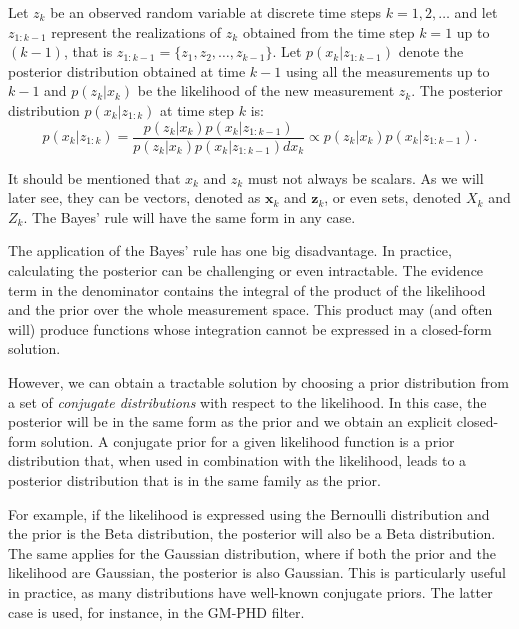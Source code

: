 \begin{theorem}
    Let $z_k$ be an observed random variable at discrete time steps
    $k = 1, 2, \ldots$ and let $z_{1:k-1}$ represent the realizations of $z_k$ 
    obtained from the time step $k = 1$ up to $(k-1)$, that is $z_{1:k-1} = 
    \{z_1, z_2,\ldots, z_{k-1}\}$. Let $p(x_k | z_{1:k-1})$ denote the posterior 
    distribution obtained at time $k-1$ using all the measurements up to $k-1$ 
    and $p(z_k | x_k)$ be the likelihood of the new measurement $z_k$. The 
    posterior distribution $p(x_k | z_{1:k})$ at time step $k$ is:
    $$
    p(x_k | z_{1:k}) 
        = \frac
            { p(z_k | x_k) p(x_k | z_{1:k-1}) }
            { p(z_k | x_k) p(x_k | z_{1:k-1}) dx_k }
        \propto p(z_k | x_k) p(x_k | z_{1:k-1}).
    $$
\end{theorem}

It should be mentioned that $x_k$ and $z_k$ must not always be scalars. As we
will later see, they can be vectors, denoted as $\mathbf{x}_k$ and 
$\mathbf{z}_k$, or even sets, denoted $X_k$ and $Z_k$. The Bayes' rule will
have the same form in any case.

The application of the Bayes' rule has one big disadvantage. In practice, 
calculating the posterior can be challenging or even intractable. The evidence 
term in the denominator contains the integral of the product of the likelihood 
and the prior over the whole measurement space. This product may (and often 
will) produce functions whose integration cannot be expressed in a closed-form 
solution.

However, we can obtain a tractable solution by choosing a prior distribution 
from a set of \textit{conjugate distributions} with respect to the likelihood. 
In this case, the posterior will be in the same form as the prior and we obtain 
an explicit closed-form solution. A conjugate prior for a given likelihood 
function is a prior distribution that, when used in combination with the 
likelihood, leads to a posterior distribution that is in the same family as the 
prior.

For example, if the likelihood is expressed using the Bernoulli distribution 
and the prior is the Beta distribution, the posterior will also be a Beta 
distribution. The same applies for the Gaussian distribution, where if both the 
prior and the likelihood are Gaussian, the posterior is also Gaussian. This is 
particularly useful in practice, as many distributions have well-known 
conjugate priors. The latter case is used, for instance, in the GM-PHD filter.

